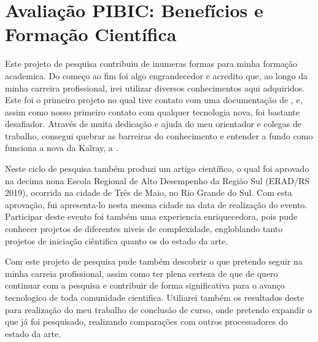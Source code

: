 \documentclass[a4paper,11pt]{article}
\begin{document}
\section{Avaliação PIBIC: Benefícios e Formação Científica}

Este projeto de pesquisa contribuiu de inumeras formas para minha formação academica. Do começo ao fim foi algo engrandecedor e acredito que, ao longo da minha carreira profissional, irei utilizar diversos conhecimentos aqui adquiridos. Este foi o primeiro projeto no qual tive contato com uma documentação de \api, e, assim como nosso primeiro contato com qualquer tecnologia nova, foi bastante desafiador. Através de muita dedicação e ajuda do meu orientador e colegas de trabalho, consegui quebrar as barreiras do conhecimento e entender a fundo como funciona a nova \api da Kalray, a \async.  

Neste ciclo de pesquisa também produzi um artigo científico, o qual foi aprovado na decima nona Escola Regional de Alto Desempenho da Região Sul (ERAD/RS 2019), ocorrida na cidade de Três de Maio, no Rio Grande do Sul. Com esta aprovação, fui apresenta-lo nesta mesma cidade na data de realização do evento. Participar deste evento foi também uma experiencia enriquecedora, pois pude conhecer projetos de diferentes niveis de complexidade, engloblando tanto projetos de iniciação ciêntifica quanto os do estado da arte.

Com este projeto de pesquisa pude também descobrir o que pretendo seguir na minha carreia profissional, assim como ter plena certeza de que de quero continuar com a pesquisa e contribuir de forma significativa para o avanço tecnologico de toda comunidade cientifica. Utiliarei também os resultados deste para realização do meu trabalho de conclusão de curso, onde pretendo expandir o que já foi pesquisado, realizando comparações com outros processadores do estado da arte.
 
 

\end{document}
